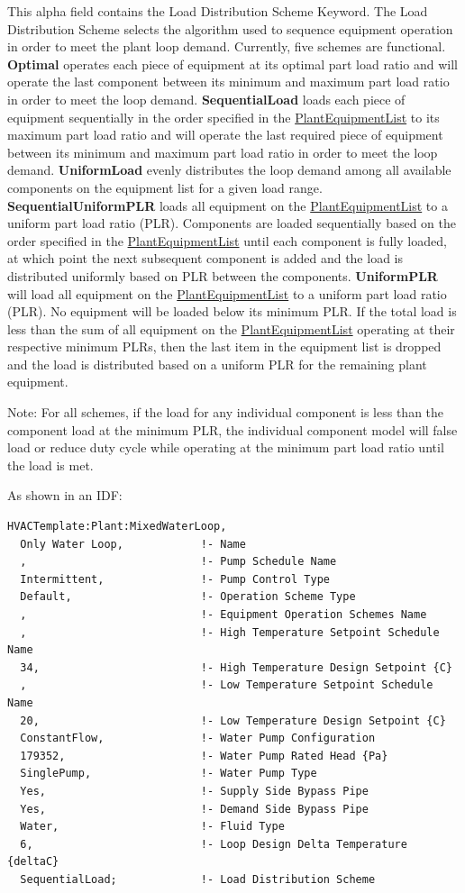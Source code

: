 This alpha field contains the Load Distribution Scheme Keyword. The Load Distribution Scheme selects the algorithm used to sequence equipment operation in order to meet the plant loop demand. Currently, five schemes are functional. \textbf{Optimal} operates each piece of equipment at its optimal part load ratio and will operate the last component between its minimum and maximum part load ratio in order to meet the loop demand. \textbf{SequentialLoad} loads each piece of equipment sequentially in the order specified in the \hyperref[plantequipmentlist]{PlantEquipmentList} to its maximum part load ratio and will operate the last required piece of equipment between its minimum and maximum part load ratio in order to meet the loop demand. \textbf{UniformLoad} evenly distributes the loop demand among all available components on the equipment list for a given load range. \textbf{SequentialUniformPLR} loads all equipment on the \hyperref[plantequipmentlist]{PlantEquipmentList} to a uniform part load ratio (PLR). Components are loaded sequentially based on the order specified in the \hyperref[plantequipmentlist]{PlantEquipmentList} until each component is fully loaded, at which point the next subsequent component is added and the load is distributed uniformly based on PLR between the components. \textbf{UniformPLR} will load all equipment on the \hyperref[plantequipmentlist]{PlantEquipmentList} to a uniform part load ratio (PLR). No equipment will be loaded below its minimum PLR. If the total load is less than the sum of all equipment on the \hyperref[plantequipmentlist]{PlantEquipmentList} operating at their respective minimum PLRs, then the last item in the equipment list is dropped and the load is distributed based on a uniform PLR for the remaining plant equipment.

Note: For all schemes, if the load for any individual component is less than the component load at the minimum PLR, the individual component model will false load or reduce duty cycle while operating at the minimum part load ratio until the load is met.

As shown in an IDF:

\begin{lstlisting}
HVACTemplate:Plant:MixedWaterLoop,
  Only Water Loop,            !- Name
  ,                           !- Pump Schedule Name
  Intermittent,               !- Pump Control Type
  Default,                    !- Operation Scheme Type
  ,                           !- Equipment Operation Schemes Name
  ,                           !- High Temperature Setpoint Schedule Name
  34,                         !- High Temperature Design Setpoint {C}
  ,                           !- Low Temperature Setpoint Schedule Name
  20,                         !- Low Temperature Design Setpoint {C}
  ConstantFlow,               !- Water Pump Configuration
  179352,                     !- Water Pump Rated Head {Pa}
  SinglePump,                 !- Water Pump Type
  Yes,                        !- Supply Side Bypass Pipe
  Yes,                        !- Demand Side Bypass Pipe
  Water,                      !- Fluid Type
  6,                          !- Loop Design Delta Temperature {deltaC}
  SequentialLoad;             !- Load Distribution Scheme
\end{lstlisting}
